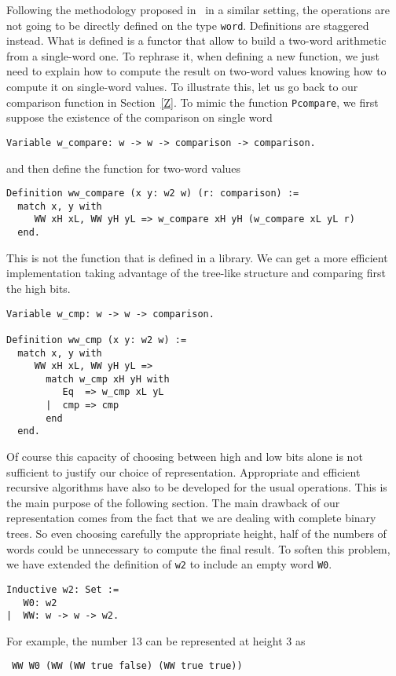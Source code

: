 Following the methodology proposed in~\cite{GreMa} in a similar setting, 
the operations are not going to be directly defined on the type {\tt word}.
Definitions are staggered instead. What is defined is a functor that 
allow to build a two-word arithmetic from a single-word one. To rephrase it,
when defining a new function, we just need to explain how to compute the 
result on two-word values knowing how to compute it on single-word values.
To illustrate this, let us go back to our comparison function in Section~\ref{Z}. 
To mimic the function {\tt Pcompare}, we first suppose the existence
of the comparison on single word
\begin{verbatim}
Variable w_compare: w -> w -> comparison -> comparison.
\end{verbatim}
and then define the function for two-word values
\begin{verbatim}
Definition ww_compare (x y: w2 w) (r: comparison) :=
  match x, y with
     WW xH xL, WW yH yL => w_compare xH yH (w_compare xL yL r) 
  end.
\end{verbatim}
This is not the function that is defined in a library. We can get
a more efficient implementation taking  advantage of the tree-like 
structure and comparing first the high bits.  
\begin{verbatim}
Variable w_cmp: w -> w -> comparison.

Definition ww_cmp (x y: w2 w) :=
  match x, y with
     WW xH xL, WW yH yL => 
       match w_cmp xH yH with 
          Eq  => w_cmp xL yL
       |  cmp => cmp
       end
  end. 
\end{verbatim}
Of course this capacity of choosing between high and low bits alone is
not sufficient to justify our choice of representation. Appropriate and efficient
recursive algorithms have also to be developed for the usual operations. This 
is the main purpose of the following section. The main drawback of our representation
comes from the fact that we are dealing with complete binary trees. So even choosing
carefully the appropriate height, half of the numbers of words could be unnecessary 
to compute the final result. 
To soften this problem, we have extended the definition of {\tt w2} to include an
empty word {\tt W0}. 
\begin{verbatim}
Inductive w2: Set :=  
   W0: w2
|  WW: w -> w -> w2.
\end{verbatim}
For example, the number 13 can be represented at height 3 as
\begin{verbatim}
 WW W0 (WW (WW true false) (WW true true))
\end{verbatim}
